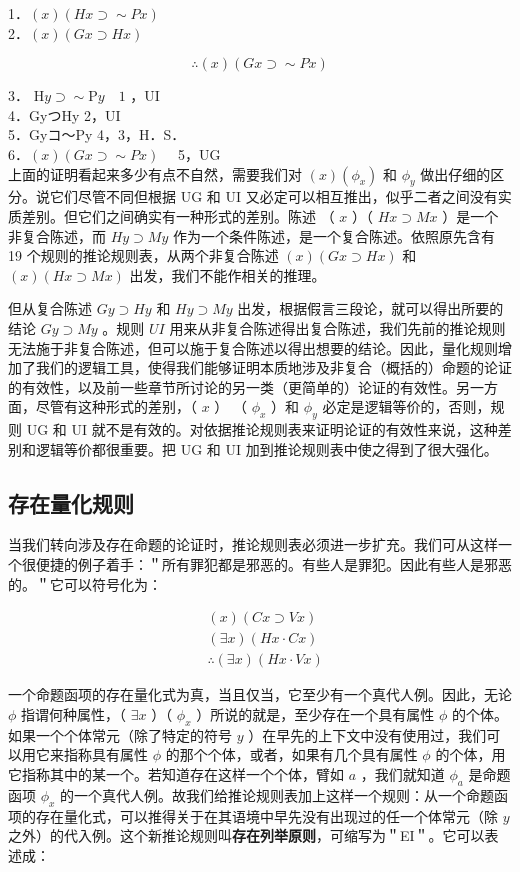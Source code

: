 1．$(x)(H x \supset \sim P x)$\\
2．$(x)(G x \supset H x)$

$$
\therefore(x)(G x \supset \sim P x)
$$

3． $\mathrm{H} y \supset \sim \mathrm{P} y \quad 1$ ，UI\\
4．GyつHy 2，UI\\
5．Gyコ～Py 4，3，H．S．\\

6．$(x)(G x \supset \sim P x) \quad$ 5，UG\\
上面的证明看起来多少有点不自然，需要我们对 $(x)\left(\phi_{x}\right)$ 和 $\phi_{y}$ 做出仔细的区分。说它们尽管不同但根据 UG 和 UI 又必定可以相互推出，似乎二者之间没有实质差别。但它们之间确实有一种形式的差别。陈述 （ $x$ ）（ $H x \supset M x$ ）是一个非复合陈述，而 $H y \supset M y$ 作为一个条件陈述，是一个复合陈述。依照原先含有 19 个规则的推论规则表，从两个非复合陈述 $(x)(G x \supset H x)$ 和 $(x)(H x \supset M x)$ 出发，我们不能作相关的推理。

但从复合陈述 $G y \supset H y$ 和 $H y \supset M y$ 出发，根据假言三段论，就可以得出所要的结论 $G y \supset M y$ 。规则 $U I$ 用来从非复合陈述得出复合陈述，我们先前的推论规则无法施于非复合陈述，但可以施于复合陈述以得出想要的结论。因此，量化规则增加了我们的逻辑工具，使得我们能够证明本质地涉及非复合（概括的）命题的论证的有效性，以及前一些章节所讨论的另一类（更简单的）论证的有效性。另一方面，尽管有这种形式的差别，（ $x$ ） （ $\phi_{x}$ ）和 $\phi_{y}$ 必定是逻辑等价的，否则，规则 UG 和 UI 就不是有效的。对依据推论规则表来证明论证的有效性来说，这种差别和逻辑等价都很重要。把 UG 和 UI 加到推论规则表中使之得到了很大强化。

\subsection{存在量化规则}

当我们转向涉及存在命题的论证时，推论规则表必须进一步扩充。我们可从这样一个很便捷的例子着手：＂所有罪犯都是邪恶的。有些人是罪犯。因此有些人是邪恶的。＂它可以符号化为：

$$
\begin{aligned}
& (x)(C x \supset V x) \\
& (\exists x)(H x \cdot C x) \\
& \therefore(\exists x)(H x \cdot V x)
\end{aligned}
$$

一个命题函项的存在量化式为真，当且仅当，它至少有一个真代人例。因此，无论 $\phi$ 指谓何种属性，（ $\exists x$ ）（ $\phi_{x}$ ）所说的就是，至少存在一个具有属性 $\phi$ 的个体。如果一个个体常元（除了特定的符号 $y$ ）在早先的上下文中没有使用过，我们可以用它来指称具有属性 $\phi$ 的那个个体，或者，如果有几个具有属性 $\phi$ 的个体，用它指称其中的某一个。若知道存在这样一个个体，臂如 $a$ ，我们就知道 $\phi_{a}$ 是命题函项 $\phi_{x}$ 的一个真代人例。故我们给推论规则表加上这样一个规则：从一个命题函项的存在量化式，可以推得关于在其语境中早先没有出现过的任一个体常元（除 $y$ 之外）的代入例。这个新推论规则叫\textbf{存在列举原则}，可缩写为＂EI＂。它可以表述成：

